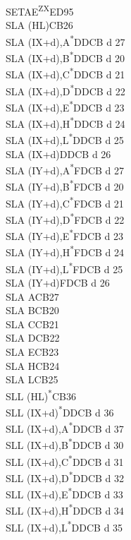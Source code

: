 \documentclass[twoside,openright,a4paper]{book}
\begin{document}
\begin{multicols}{3}
{\begin{tabbing}
	SETAE\textsuperscript{ZX}\>ED95\\
	SLA (HL)\>CB26\\
	SLA (IX+d),A\textsuperscript{*}\>DDCB d 27\\
	SLA (IX+d),B\textsuperscript{*}\>DDCB d 20\\
	SLA (IX+d),C\textsuperscript{*}\>DDCB d 21\\
	SLA (IX+d),D\textsuperscript{*}\>DDCB d 22\\
	SLA (IX+d),E\textsuperscript{*}\>DDCB d 23\\
	SLA (IX+d),H\textsuperscript{*}\>DDCB d 24\\
	SLA (IX+d),L\textsuperscript{*}\>DDCB d 25\\
	SLA (IX+d)\>DDCB d 26\\
	SLA (IY+d),A\textsuperscript{*}\>FDCB d 27\\
	SLA (IY+d),B\textsuperscript{*}\>FDCB d 20\\
	SLA (IY+d),C\textsuperscript{*}\>FDCB d 21\\
	SLA (IY+d),D\textsuperscript{*}\>FDCB d 22\\
	SLA (IY+d),E\textsuperscript{*}\>FDCB d 23\\
	SLA (IY+d),H\textsuperscript{*}\>FDCB d 24\\
	SLA (IY+d),L\textsuperscript{*}\>FDCB d 25\\
	SLA (IY+d)\>FDCB d 26\\
	SLA A\>CB27\\
	SLA B\>CB20\\
	SLA C\>CB21\\
	SLA D\>CB22\\
	SLA E\>CB23\\
	SLA H\>CB24\\
	SLA L\>CB25\\
	SLL (HL)\textsuperscript{*}\>CB36\\
	SLL (IX+d)\textsuperscript{*}\>DDCB d 36\\
	SLL (IX+d),A\textsuperscript{*}\>DDCB d 37\\
	SLL (IX+d),B\textsuperscript{*}\>DDCB d 30\\
	SLL (IX+d),C\textsuperscript{*}\>DDCB d 31\\
	SLL (IX+d),D\textsuperscript{*}\>DDCB d 32\\
	SLL (IX+d),E\textsuperscript{*}\>DDCB d 33\\
	SLL (IX+d),H\textsuperscript{*}\>DDCB d 34\\
	SLL (IX+d),L\textsuperscript{*}\>DDCB d 35\\

\end{tabbing}}
\end{multicols}
\end{document}
